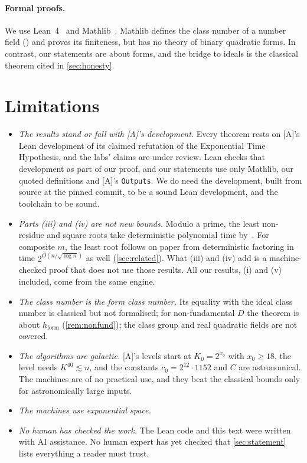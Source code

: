 \documentclass[10pt]{amsart}
\theoremstyle{plain}
\theoremstyle{definition}
\theoremstyle{remark}
\numberwithin{equation}{section}
\newcommand{\A}{\textup{[A]}}
\newcommand{\hF}{h_{\mathrm{form}}}
\newcommand{\rate}{2^{O(n/\sqrt{\log n})}}
\begin{document}
\paragraph{Formal proofs.} We use Lean~4~\cite{Lean4} and Mathlib~\cite{Mathlib20}. Mathlib defines the class
number of a number field () and proves its finiteness, but has no theory of
binary quadratic forms. In contrast, our statements are about forms, and the bridge to ideals is the
classical theorem cited in \cref{sec:honesty}.

\section{Limitations}\label{sec:limitations}

\begin{itemize}
\item \emph{The results stand or fall with \A's development.} Every theorem rests on \A's Lean development
of its claimed refutation of the Exponential Time Hypothesis, and the labs' claims are under review. Lean
checks that development as part of our proof, and our statements use only Mathlib, our quoted definitions
and \A's \texttt{Outputs}. We do need the development, built from source at the pinned commit, to be a
sound Lean development, and the toolchain to be sound.
\item \emph{Parts (iii) and (iv) are not new bounds.} Modulo a prime, the least non-residue and
square roots take deterministic polynomial time by~\cite{OAI003,OAI142}. For composite $m$, the least root
follows on paper from deterministic factoring in time $\rate$ as well (\cref{sec:related}). What (iii) and
(iv) add is a machine-checked proof that does not use those results. All our results, (i) and (v) included,
come from the same engine.
\item \emph{The class number is the form class number.} Its equality with the ideal class number is
classical but not formalised; for non-fundamental $D$ the theorem is about $\hF$
(\cref{rem:nonfund}); the class group and real quadratic fields are not covered.
\item \emph{The algorithms are galactic.} \A's levels start at $K_0=2^{x_0}$ with $x_0\ge18$, the level
needs $K^{40}\lesssim n$, and the constants $c_0=2^{12}\cdot1152$ and $C$ are astronomical. The machines are
of no practical use, and they beat the classical bounds only for astronomically large inputs.
\item \emph{The machines use exponential space.}
\item \emph{No human has checked the work.} The Lean code and this text were written with AI assistance.
No human expert has yet checked that \cref{sec:statement} lists everything a reader must trust.
\end{itemize}
\end{document}
